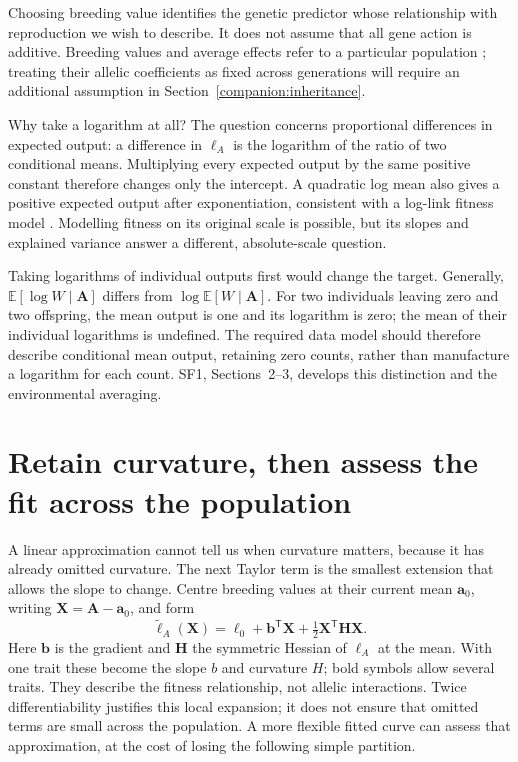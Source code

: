 Choosing breeding value identifies the genetic predictor whose relationship
with reproduction we wish to describe. It does not assume that all gene
action is additive. Breeding values and average effects refer to a
particular population \citep{Fisher1941}; treating their allelic coefficients
as fixed across generations will require an additional assumption in
Section~\ref{companion:inheritance}.

Why take a logarithm at all? The question concerns proportional differences
in expected output: a difference in $\ell_A$ is the logarithm of the ratio of
two conditional means. Multiplying every expected output by the same
positive constant therefore changes only the intercept. A quadratic log
mean also gives a positive expected output after exponentiation, consistent
with a log-link fitness model \citep{MorrisseyGoudie2022}. Modelling fitness
on its original scale is possible, but its slopes and explained variance
answer a different, absolute-scale question.

Taking logarithms of individual outputs first would change the target.
Generally, $\mathbb E[\log W\mid\mathbf A]$ differs from
$\log\mathbb E[W\mid\mathbf A]$. For two individuals leaving zero and two
offspring, the mean output is one and its logarithm is zero; the mean of
their individual logarithms is undefined. The required data model should
therefore describe conditional mean output, retaining zero counts, rather
than manufacture a logarithm for each count. SF1, Sections~2--3, develops
this distinction and the environmental averaging.

\clearpage
\section{Retain curvature, then assess the fit across the population}
\label{companion:projection}

A linear approximation cannot tell us when curvature matters, because it
has already omitted curvature. The next Taylor term is the smallest
extension that allows the slope to change. Centre breeding values at their
current mean $\mathbf a_0$, writing $\mathbf X=\mathbf A-\mathbf a_0$, and
form
\begin{equation}
 \widetilde\ell_A(\mathbf X)
 =\ell_0+\mathbf b^{\mathsf T}\mathbf X
       +\tfrac12\mathbf X^{\mathsf T}\mathbf H\mathbf X.
 \label{companion:eq:quadratic}
\end{equation}
Here $\mathbf b$ is the gradient and $\mathbf H$ the symmetric Hessian of
$\ell_A$ at the mean. With one trait these become the slope $b$ and
curvature $H$; bold symbols allow several traits. They describe the fitness
relationship, not allelic interactions. Twice differentiability justifies
this local expansion; it does not ensure that omitted terms are small
across the population. A more flexible fitted curve can assess that
approximation, at the cost of losing the following simple partition.


